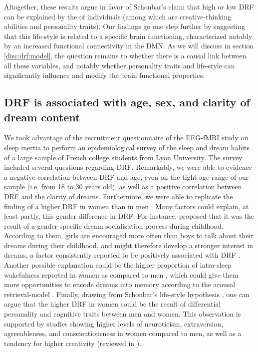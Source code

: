 Altogether, these results argue in favor of Schonbar's claim \citeyearpar{schonbar_differential_1965} that high or low DRF can be explained by the  of individuals (among which are creative-thinking abilities and personality traits). Our findings go one step further by suggesting that this life-style is related to a specific brain functioning, characterized notably by an increased functional connectivity in the DMN. As we will discuss in section \ref{disc:drf:model}, the question remains to whether there is a causal link between all these variables, and notably whether personality traits and life-style can significantly influence and modify the brain functional properties.

\subsection{DRF is associated with age, sex, and clarity of dream content}
\label{disc:drf:summary:survey}

We took advantage of the recruitment questionnaire of the EEG-fMRI study on sleep inertia to perform an epidemiological survey of the sleep and dream habits of a large sample of French college students from Lyon University. The survey included several questions regarding DRF. Remarkably, we were able to evidence a negative correlation between DRF and age, even on the tight age range of our sample (i.e. from 18 to 30 years old), as well as a positive correlation between DRF and the clarity of dreams. Furthermore, we were able to replicate the finding of a higher DRF in women than in men \citep{schredl_gender_2008}. Many factors could explain, at least partly, this gender difference in DRF. For instance, \citet{schredl_gender_2008} proposed that it was the result of a gender-specific dream socialization process during childhood. According to them, girls are encouraged more often than boys to talk about their dreams during their childhood, and might therefore develop a stronger interest in dreams, a factor consistently reported to be positively associated with DRF \citep{schredl_factors_2003}. Another possible explanation could be the higher proportion of intra-sleep wakefulness reported in women as compared to men \citep{reyner_gender-and_1995}, which could give them more opportunities to encode dreams into memory according to the arousal retrieval-model \citep{koulack_dream_1976}. Finally, drawing from Schonbar's life-style hypothesis \citeyearpar{schonbar_differential_1965}, one can argue that the higher DRF in women could be the result of differential personality and cognitive traits between men and women. This observation is supported by studies showing higher levels of neuroticism, extraversion, agreeableness, and conscientiousness in women compared to men, as well as a tendency for higher creativity (reviewed in \citealp{schmitt_why_2009, baer_gender_2008}).

